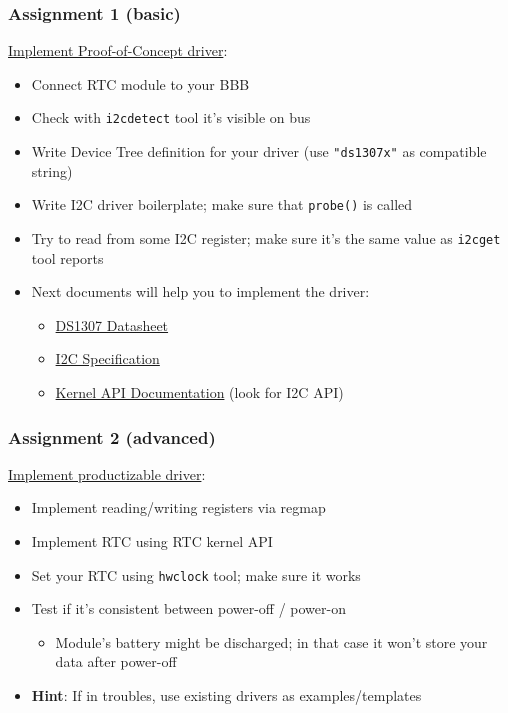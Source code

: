 \documentclass[aspectratio=169,usenames,dvipsnames]{beamer}
\begin{document}
\begin{frame}
  \frametitle{Assignment 1 (basic)}
  \underline{Implement Proof-of-Concept driver}:
  \begin{itemize}
    \item Connect RTC module to your BBB
    \item Check with \texttt{i2cdetect} tool it's visible on bus
    \item Write Device Tree definition for your driver (use \texttt{"ds1307x"}
          as compatible string)
    \item Write I2C driver boilerplate; make sure that \texttt{probe()} is
          called
    \item Try to read from some I2C register; make sure it's the same value as
          \texttt{i2cget} tool reports
    \item Next documents will help you to implement the driver:
    \begin{itemize}
      \item \href{https://datasheets.maximintegrated.com/en/ds/DS1307.pdf}
                 {DS1307 Datasheet}
      \item \href {https://www.nxp.com/docs/en/user-guide/UM10204.pdf}
                  {I2C Specification}
      \item \href {https://www.kernel.org/doc/html/v4.19/}
                  {Kernel API Documentation} (look for I2C API)
    \end{itemize}
  \end{itemize}
\end{frame}

\begin{frame}
  \frametitle{Assignment 2 (advanced)}
  \underline{Implement productizable driver}:
  \begin{itemize}
    \item Implement reading/writing registers via regmap
    \item Implement RTC using RTC kernel API
    \item Set your RTC using \texttt{hwclock} tool; make sure it works
    \item Test if it's consistent between power-off / power-on
    \begin{itemize}
      \item Module's battery might be discharged; in that case it won't store
            your data after power-off
    \end{itemize}
    \item \textbf{Hint}: If in troubles, use existing drivers as
          examples/templates
  \end{itemize}
\end{frame}
\end{document}
